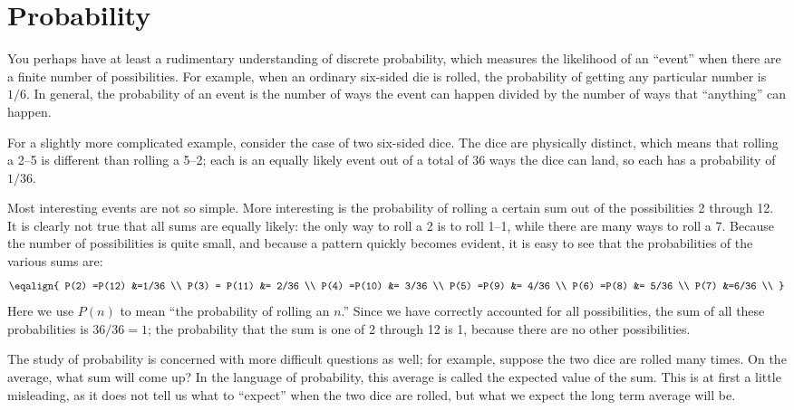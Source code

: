\section{Probability}{}{}
\label{sec:probability}
\nobreak
You perhaps have at least a rudimentary understanding of
{\dfont discrete probability}, which
measures the likelihood of an ``event'' when there are a finite number
of possibilities. For example, when an ordinary six-sided die is
rolled, the probability of getting any particular number is $1/6$. In
general, the probability of an event is the number of ways the event
can happen divided by the number of ways that ``anything'' can happen.

For a slightly more complicated example, consider the case of two
six-sided dice. The dice are physically distinct, which means that
rolling a 2--5 is different than rolling a 5--2; each is an equally
likely event out of a total of 36 ways the dice can land, so each has
a probability of $1/36$.

Most interesting events are not so simple. More interesting is the
probability of rolling a certain sum out of the possibilities 2
through 12. It is clearly not true that all sums are equally likely:
the only way to roll a 2 is to roll 1--1, while there are many ways to
roll a 7. Because the number of possibilities is quite small, and
because a pattern quickly becomes evident, it is easy to see that the
probabilities of the various sums are:
$$\eqalign{
  P(2) =P(12)  &=1/36 \\  
  P(3) = P(11) &= 2/36 \\
  P(4) =P(10)  &= 3/36 \\
  P(5) =P(9)   &= 4/36 \\
  P(6) =P(8)   &= 5/36 \\
  P(7)         &=6/36 \\
}$$
Here we use $P(n)$ to mean ``the probability of rolling an $n$.''
Since we have correctly accounted for all possibilities, the sum of
all these probabilities is $36/36=1$; the probability that the sum is
one of 2 through 12 is 1, because there are no other possibilities.

The study of probability is concerned with more difficult questions as
well; for example, suppose the two dice are rolled many times. On the
average, what sum will come up? In the language of probability, this
average is called the {\dfont expected value\/}
of the sum. This is at first a little misleading, as it does not tell
us what to ``expect'' when the two dice are rolled, but what we expect
the long term average will be.

